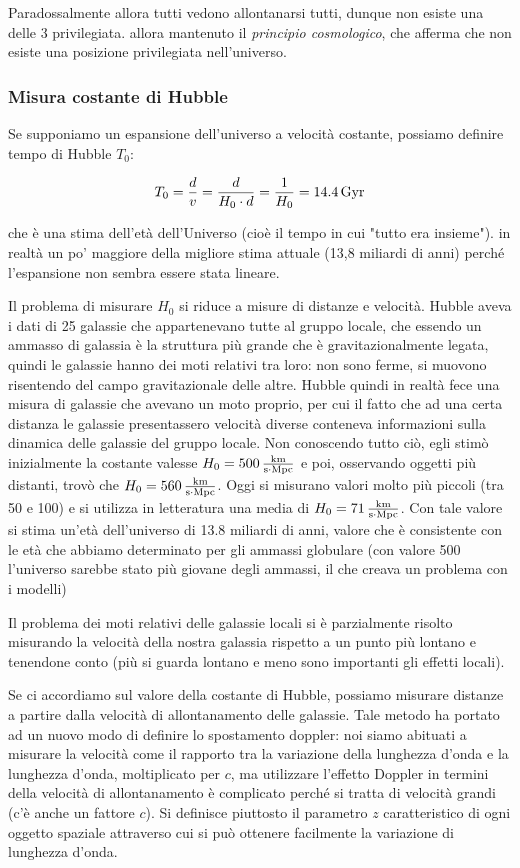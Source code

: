Paradossalmente allora tutti vedono allontanarsi tutti, dunque non esiste una delle 3 privilegiata. \E allora mantenuto il \textit{principio cosmologico}, che afferma che non esiste una posizione privilegiata nell'universo.

\subsubsection{Misura costante di Hubble}
Se supponiamo un espansione dell'universo a velocità costante, possiamo definire tempo di Hubble $T_0$:

$$T_0=\frac{d}{v}=\frac{d}{H_0 \cdot d}=\frac{1}{H_0}=14.4 \, \rm Gyr$$

che è una stima dell'età dell'Universo (cioè il tempo in cui "tutto era insieme"). \E in realtà un po' maggiore della migliore stima attuale (13,8 miliardi di anni) perché l'espansione non sembra essere stata lineare.

Il problema di misurare $H_0$ si riduce a misure di distanze e velocità. Hubble aveva i dati di 25 galassie che appartenevano tutte al gruppo locale, che essendo un ammasso di galassia è la struttura più grande che è gravitazionalmente legata, quindi le galassie hanno dei moti relativi tra loro: non sono ferme, si muovono risentendo del campo gravitazionale delle altre. Hubble quindi in realtà fece una misura di galassie che avevano un moto proprio, per cui il fatto che ad una certa distanza le galassie presentassero velocità diverse conteneva informazioni sulla dinamica delle galassie del gruppo locale. Non conoscendo tutto ciò, egli stimò inizialmente la costante valesse $H_0=500 \, \rm \frac{km}{s \cdot Mpc}$ e poi, osservando oggetti più distanti, trovò che $H_0=560 \, \rm \frac{km}{s \cdot Mpc}$. Oggi si misurano valori molto più piccoli (tra 50 e 100) e si utilizza in letteratura una media di $H_0=71 \, \rm \frac{km}{s \cdot Mpc}$. Con tale valore si stima un'età dell'universo di 13.8 miliardi di anni, valore che è consistente con le età che abbiamo determinato per gli ammassi globulare (con valore 500 l'universo sarebbe stato più giovane degli ammassi, il che creava un problema con i modelli)

Il problema dei moti relativi delle galassie locali si è parzialmente risolto misurando la velocità della nostra galassia rispetto a un punto più lontano e tenendone conto (più si guarda lontano e meno sono importanti gli effetti locali).

Se ci accordiamo sul valore della costante di Hubble, possiamo misurare distanze a partire dalla velocità di allontanamento delle galassie. Tale metodo ha portato ad un nuovo modo di definire lo spostamento doppler: noi siamo abituati a misurare la velocità come il rapporto tra la variazione della lunghezza d'onda e la lunghezza d'onda, moltiplicato per $c$, ma utilizzare l'effetto Doppler in termini della velocità di allontanamento è complicato perché si tratta di velocità grandi (c'è anche un fattore $c$). Si definisce piuttosto il parametro $z$ caratteristico di ogni oggetto spaziale attraverso cui si può ottenere facilmente la variazione di lunghezza d'onda.

